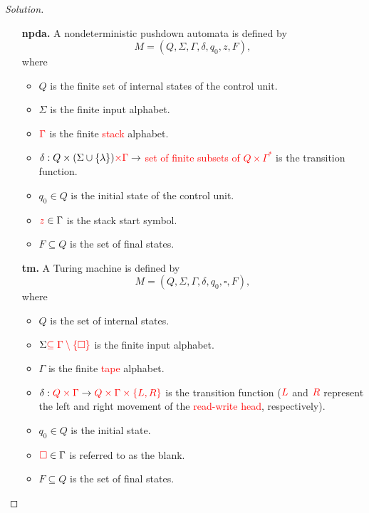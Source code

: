 \documentclass[ 12pt ]{article}
\begin{document}
\begin{enumerate}
\begin{proof}[Solution]
\begin{enumerate}
				\item[\textbf{npda.}] A nondeterministic pushdown automata is defined by $$M = (Q, \Sigma, \Gamma, \delta, q_0, z, F),$$ where
					\begin{itemize}
						\item $Q$ is the finite set of internal states of the control unit.
						\item $\Sigma$ is the finite input alphabet.
						\item $\textcolor{red}{\Gamma}$ is the finite \textcolor{red}{stack} alphabet.
						\item $\delta : Q \times (\Sigma \cup \{ \lambda \}) \textcolor{red}{\times \Gamma} \to$ \textcolor{red}{set of finite subsets of $Q \times \Gamma^*$} is the
							transition function.
						\item $q_0 \in Q$ is the initial state of the control unit.
						\item $\textcolor{red}{z} \in \Gamma$ is the stack start symbol.
						\item $F \subseteq Q$ is the set of final states.
					\end{itemize}

				\item[\textbf{tm.}] A Turing machine is defined by $$M = (Q, \Sigma, \Gamma, \delta, q_0, \square, F),$$ where
					\begin{itemize}
						\item $Q$ is the set of internal states.
						\item $\Sigma \textcolor{red}{\subseteq \Gamma \setminus \{ \square \}}$ is the finite input alphabet.
						\item $\Gamma$ is the finite \textcolor{red}{tape} alphabet.
						\item $\delta : \textcolor{red}{Q \times \Gamma} \to \textcolor{red}{Q \times \Gamma \times \{ L, R \}}$ is the transition function ($\textcolor{red}{L}$ and
							$\textcolor{red}{R}$ represent the left and right movement of the \textcolor{red}{read-write head}, respectively).
						\item $q_0 \in Q$ is the initial state.
						\item $\textcolor{red}{\square} \in \Gamma$ is referred to as the blank.
						\item $F \subseteq Q$ is the set of final states.
					\end{itemize}
			\end{enumerate}


\end{proof}
\end{enumerate}
\end{document}
